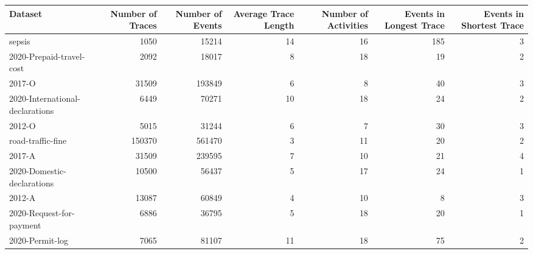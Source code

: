 \begin{tabular}{lrrrrrr}
\toprule
Dataset & Number of Traces & Number of Events & Average Trace Length & Number of Activities & Events in Longest Trace & Events in Shortest Trace \\
\midrule
sepsis & 1050 & 15214 & 14 & 16 & 185 & 3 \\
2020-Prepaid-travel-cost & 2092 & 18017 & 8 & 18 & 19 & 2 \\
2017-O & 31509 & 193849 & 6 & 8 & 40 & 3 \\
2020-International-declarations & 6449 & 70271 & 10 & 18 & 24 & 2 \\
2012-O & 5015 & 31244 & 6 & 7 & 30 & 3 \\
road-traffic-fine & 150370 & 561470 & 3 & 11 & 20 & 2 \\
2017-A & 31509 & 239595 & 7 & 10 & 21 & 4 \\
2020-Domestic-declarations & 10500 & 56437 & 5 & 17 & 24 & 1 \\
2012-A & 13087 & 60849 & 4 & 10 & 8 & 3 \\
2020-Request-for-payment & 6886 & 36795 & 5 & 18 & 20 & 1 \\
2020-Permit-log & 7065 & 81107 & 11 & 18 & 75 & 2 \\
\bottomrule
\end{tabular}
